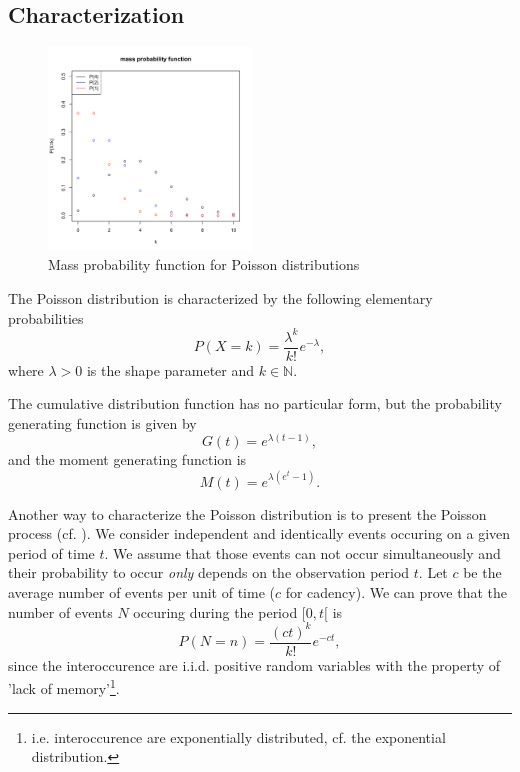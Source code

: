 \subsection{Characterization}
\begin{figure}
  \vspace{-20pt}
  \begin{center}
    \includegraphics[width=0.48\textwidth]{img/poissonzoom}
  \end{center}
  \vspace{-20pt}
  \caption{Mass probability function for Poisson distributions}
  \vspace{-20pt}
\end{figure}

The Poisson distribution is characterized by the following elementary probabilities
$$
P(X=k) = \frac{\lambda^k}{k!}e^{-\lambda},
$$
where $\lambda>0$ is the shape parameter and $k\in\mathbb N$.

The cumulative distribution function has no particular form, but the probability generating function is
given by
$$
G(t) = e^{\lambda(t-1)},
$$
and the moment generating function is
$$
M(t) = e^{\lambda(e^t-1)}.
$$

Another way to characterize the Poisson distribution is to present the Poisson process (cf. \cite{saporta}). We consider independent and identically events occuring on a given period of time $t$. We assume that those events can not occur simultaneously and their probability to occur \emph{only} depends on the observation period $t$. Let $c$ be the average number of events per unit of time ($c$ for cadency). We can prove that the number of events $N$ occuring during the period $[0,t[$ is 
$$
P(N=n) = \frac{(ct)^k}{k!}e^{-ct},
$$
since the interoccurence are i.i.d. positive random variables with the property of 'lack of memory'\footnote{i.e. interoccurence are exponentially distributed, cf. the exponential distribution.}.

